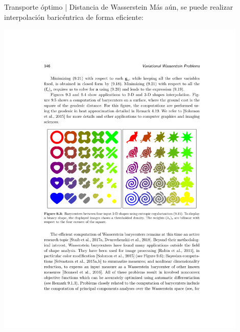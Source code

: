\documentclass[aspectratio=43, 10pt]{beamer}
\begin{document}
\begin{frame}{Transporte óptimo | Distancia de Wasserstein}
    Más aún, se puede realizar interpolación baricéntrica de forma eficiente:
    \begin{center}
        \includegraphics[width=0.9\textwidth]{images/ot/barycenter}
    \end{center}
\end{frame}
    
\end{document}
